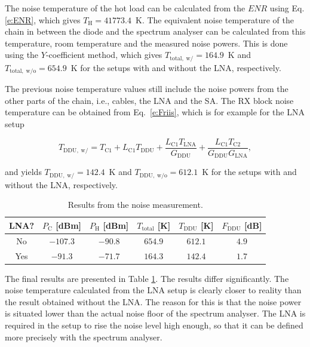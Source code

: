 \documentclass[a4paper, 12pt]{article}
\begin{document}
The noise temperature of the hot load can be calculated from the $\mathit{ENR}$ using Eq. \ref{e:ENR}, which 
gives $T_\mathrm{H} = 41773.4$~K. The equivalent noise temperature of the chain in between the diode and 
the spectrum analyser can be calculated from this temperature, room temperature and the measured 
noise powers. This is done using the $Y$-coefficient method, which gives $T_{\mathrm{total,\;w/}} = 164.9$~K 
and $T_{\mathrm{total,\;w/o}} = 654.9$~K for the setups with and without the LNA, respectively.

The previous noise temperature values still include the noise powers from the other parts of the 
chain, i.e., cables, the LNA and the SA. The RX block noise temperature can be obtained from Eq.~\ref{e:Friis},
which is for example for the LNA setup

\begin{equation}
T_\mathrm{DDU,\;w/} = T_\mathrm{C1} + L_\mathrm{C1} T_\mathrm{DDU} + \frac{L_\mathrm{C1} T_\mathrm{LNA}}{G_\mathrm{DDU}} + \frac{L_\mathrm{C1} T_\mathrm{C2}}{G_\mathrm{DDU} G_\mathrm{LNA}},
\end{equation}

\noindent
and yields $T_{\mathrm{DDU,\;w/}} = 142.4$~K and $T_{\mathrm{DDU,\;w/o}} = 612.1$~K for the setups 
with and without the LNA, respectively.

\begin{table}[!h]
	\begin{center}
	\caption{Results from the noise measurement.}
	\label{t:noise}
	\renewcommand*{\arraystretch}{1.2}
	\begin{tabular}{cccccc}
	LNA? 			& $P_\mathrm{C}$ [dBm] 		& $P_\mathrm{H}$ [dBm]	& $T_\mathrm{total}$ [K] 	& $T_\mathrm{DDU}$ [K] 	& $F_\mathrm{DDU}$ [dB] \\
	\hline
	No				& $-107.3$					& $-90.8$				& $654.9$ 							& $612.1$ 						& $4.9$\\
	Yes				& $-91.3$					& $-71.7$				& $164.3$ 							& $142.4$ 						& $1.7$ 	
	\end{tabular}
	\end{center}
	\vspace*{-12pt}
\end{table}


The final results are presented in Table \ref{t:noise}. The results differ significantly. The noise temperature 
calculated from the LNA setup is clearly closer to reality than the result obtained without the LNA. 
The reason for this is that the noise power is situated lower than the actual noise floor of the 
spectrum analyser. The LNA is required in the setup to rise the noise level high enough, so that it 
can be defined more precisely with the spectrum analyser.
\end{document}

